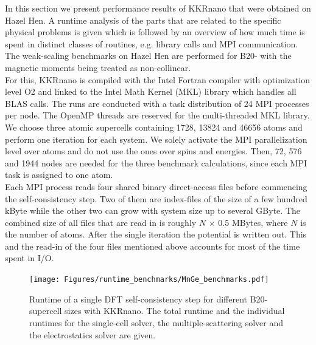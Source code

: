 \documentclass [a4paper, 12pt]{article}
\begin{document}
In this section we present performance results of KKRnano that were obtained on Hazel Hen.
A runtime analysis of the parts that are related to the specific physical problems is given
which is followed by an overview of how much time is spent in distinct
classes of routines, e.g. library calls and MPI communication.\\

The weak-scaling benchmarks on Hazel Hen are performed for B20- 
with the magnetic moments being treated as
non-collinear.
\\
For this, KKRnano is compiled with the Intel Fortran compiler
with optimization level O2 and linked to the Intel Math Kernel (MKL) library which handles all BLAS calls.
The runs are conducted with a task distribution of 24 MPI processes per node. The OpenMP threads 
are reserved for the multi-threaded MKL library.
We choose three atomic supercells containing 1728, 13824 and 46656 atoms 
and perform one iteration for each system.
We solely activate the MPI parallelization level over atoms and do not use the ones over spins and energies.
Then, 72, 576 and 1944 nodes
are needed for the three benchmark calculations, since each MPI task is assigned to one atom. 
\\
Each MPI process reads four shared binary direct-access
files before commencing the self-consistency step.
Two of them are index-files of the size of a few hundred kByte while the other two can grow with system size
up to several GByte. The combined size of all files that are 
read in is roughly $N$ $\times$ 0.5 MBytes, where $N$ is the number of atoms. After the single iteration 
the potential is written out. 
This and the read-in of the four files mentioned above accounts for most of the time spent in I/O.

\begin{figure}[h]
\begin{center}
 \texttt{[image: Figures/runtime\_benchmarks/MnGe\_benchmarks.pdf]}
\end{center}
	\caption{Runtime of a single DFT self-consistency step
	for different B20- supercell sizes with KKRnano. 
	The total runtime and the individual runtimes for the single-cell solver,
	the multiple-scattering solver and the electrostatics solver are given.
	}
\label{fig:MnGe_6x6x6_benchmark}
\end{figure}
\end{document}
